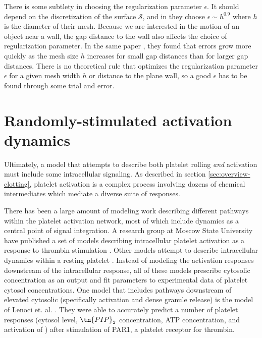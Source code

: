 There is some subtlety in choosing the regularization parameter
$\epsilon$. It should depend on the discretization of the surface
$\mathcal{S}$, and in \cite{Ainley2008} they choose $\epsilon \sim
h^{0.9}$ where $h$ is the diameter of their mesh. Because we are
interested in the motion of an object near a wall, the gap distance to
the wall also affects the choice of regularization parameter. In the
same paper \cite{Ainley2008}, they found that errors grow more quickly
as the mesh size $h$ increases for small gap distances than for larger
gap distances. There is no theoretical rule that optimizes the
regularization parameter $\epsilon$ for a given mesh width $h$ or
distance to the plane wall, so a good $\epsilon$ has to be found
through some trial and error.


\section{Randomly-stimulated activation dynamics}
\label{sec:intr-sign}

Ultimately, a model that attempts to describe both platelet rolling
\emph{and} activation must include some intracellular signaling. As
described in section \ref{sec:overview-clotting}, platelet activation
is a complex process involving dozens of chemical intermediates which
mediate a diverse suite of responses.

There has been a large amount of modeling work describing different
pathways within the platelet activation network, most of which include
\Ca dynamics as a central point of signal integration. A research
group at Moscow State University have published a set of models
describing intracellular platelet activation as a response to thrombin
stimulation
\cite{Shakhidzhanov2015,Sveshnikova2015,Balabin2016,Sveshnikova2016}. Other
models attempt to describe intracellular \Ca dynamics within a resting
platelet \cite{Purvis2008,Dolan2014}. Instead of modeling the
activation responses downstream of the intracellular \Ca response, all
of these models prescribe cytosolic \Ca concentration as an output and
fit parameters to experimental data of platelet cytosol \Ca
concentrations. One model that includes pathways downstream of
elevated cytosolic \Ca (specifically  activation and
dense granule release) is the model of Lenoci
et. al. \cite{Lenoci2011}. They were able to accurately predict a
number of platelet responses (cytosol \Ca level, $\tn{PIP}_2$
concentration, ATP concentration, and activation of )
after stimulation of PAR1, a platelet receptor for thrombin.


